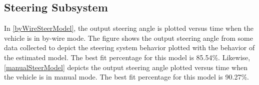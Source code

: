 \documentclass[letterpaper,12pt]{article}   %
\begin{document}
\subsection{Steering Subsystem}
In \autoref{byWireSteerModel}, the output steering angle is plotted versus time
when the vehicle is in by-wire mode. The figure shows the output steering angle
from some data collected to depict the steering system behavior plotted with the
behavior of the estimated model. The best fit percentage for this model is
85.54\%. Likewise, \autoref{manualSteerModel} depicts the output steering angle
plotted versus time when the vehicle is in manual mode. The best fit percentage
for this model is 90.27\%.


\end{document}

